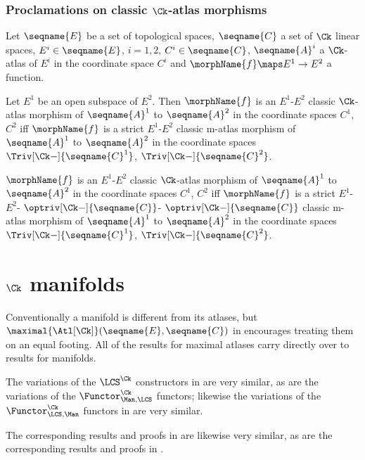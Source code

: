 \documentclass{article}
\begin{document}
\subsubsection{Proclamations on classic \ensuremath{\Ck}-atlas morphisms}
\begin{lemma}
\label{lem:Ck-ATLcmorph}
Let $\seqname{E}$ be a set of topological spaces, $\seqname{C}$ a set of
$\Ck$ linear spaces, $E^i \in \seqname{E}$, $i=1,2$,
$C^i \in \seqname{C}$, $\seqname{A}^i$ a $\Ck$-atlas of $E^i$ in the
coordinate space $C^i$ and $\morphName{f} \maps E^1 \to E^2$ a function.

Let $E^1$ be an open subspace of $E^2$. Then $\morphName{f}$ is an
$E^1$-$E^2$ classic $\Ck$-atlas morphism of $\seqname{A}^1$ to
$\seqname{A}^2$ in the coordinate spaces $C^1$, $C^2$ iff $\morphName{f}$
is a strict $E^1$-$E^2$ classic m-atlas morphism of $\seqname{A}^1$ to
$\seqname{A}^2$ in the coordinate spaces $\Triv[\Ck-]{\seqname{C}^1}$,
$\Triv[\Ck-]{\seqname{C}^2}$.

$\morphName{f}$ is an $E^1$-$E^2$ classic $\Ck$-atlas morphism of
$\seqname{A}^1$ to $\seqname{A}^2$ in the coordinate spaces $C^1$, $C^2$
iff $\morphName{f}$ is a strict
$E^1$-$E^2$-%
$\optriv[\Ck-]{\seqname{C}}$-%
$\optriv[\Ck-]{\seqname{C}}$
classic m-atlas morphism of $\seqname{A}^1$ to $\seqname{A}^2$ in the
coordinate spaces $\Triv[\Ck-]{\seqname{C}^1}$,
$\Triv[\Ck-]{\seqname{C}^2}$.


\end{lemma}

\section {$\Ck$ manifolds}
\label{sec:ckman}
Conventionally a manifold is different from its atlases, but
$\maximal{\Atl[\Ck]}(\seqname{E}, \seqname{C})$ in
 encourages treating them on an equal footing.
All of the results for maximal atlases carry directly over to results
for manifolds.

\begin{remark}
The variations of the $\LCS^\Ck$ constructors in
 are very similar, as are the variations of
the $\Functor^\Ck_{\Man,\LCS}$ functors; likewise the variations of the
$\Functor^\Ck_{\LCS,\Man}$ functors in   are very
similar.

The corresponding results and proofs in 
are likewise very similar, as are the corresponding results and proofs
in .
\end{remark}
\end{document}
